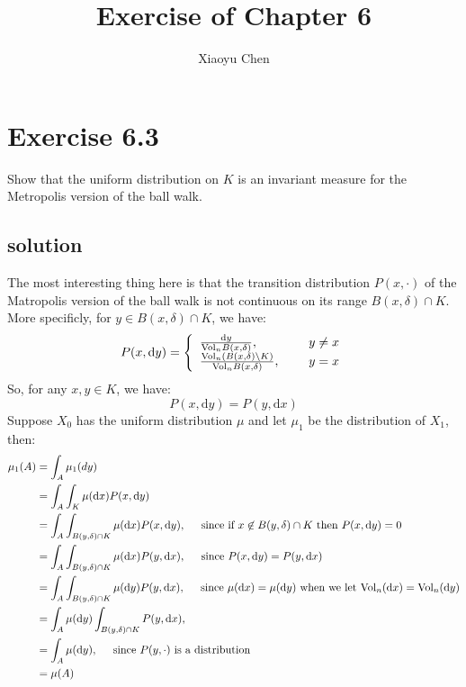 \documentclass{article}
\title{Exercise of Chapter 6}
\author{Xiaoyu Chen}
\date{}
\begin{document}
\maketitle
\section{Exercise 6.3}
Show that the uniform distribution on $K$ is an invariant measure for the Metropolis version of the ball walk.
\subsection{solution}
The most interesting thing here is that the transition distribution $P(x,\cdot)$ of the Matropolis version of the ball walk is not continuous on its range $B(x,\delta)\cap K$. More specificly, for $y\in B(x,\delta)\cap K$, we have:
\[
  P(x, \mathrm{d}y) = \left\{
    \begin{array}{lr}
      \frac{\mathrm{d}y}{\mathrm{Vol}_n B(x, \delta)}, \hspace{0.5cm} & y\not= x \\
      \frac{\mathrm{Vol}_n(B(x,\delta)\setminus K)}{\mathrm{Vol}_n B(x, \delta)}, \hspace{0.5cm} &y = x
    \end{array}
  \right.
\]
So, for any $x, y\in K$, we have:
\[
  P(x,\mathrm{d}y) = P(y, \mathrm{d}x)
\]
Suppose $X_0$ has the uniform distribution $\mu$ and let $\mu_1$ be the distribution of $X_1$, then:
\begin{align*}
  \mu_1(A) &= \int_A \mu_1(dy) \\
  &= \int_A\int_K \mu(\mathrm{d}x) P(x, \mathrm{d}y) \\
  &= \int_A\int_{B(y,\delta)\cap K} \mu(\mathrm{d}x) P(x, \mathrm{d}y), \hspace{0.5cm} \mbox{since if $x\not\in B(y,\delta)\cap K$ then $P(x,\mathrm{d}y) = 0$}\\
  &= \int_A\int_{B(y,\delta)\cap K} \mu(\mathrm{d}x) P(y, \mathrm{d}x), \hspace{0.5cm} \mbox{since $P(x,\mathrm{d}y) = P(y,\mathrm{d}x)$} \\
  &= \int_A\int_{B(y,\delta)\cap K} \mu(\mathrm{d}y) P(y, \mathrm{d}x), \hspace{0.5cm} \mbox{since $\mu(\mathrm{d}x) = \mu(\mathrm{d}y)$ when we let $\mathrm{Vol}_n(\mathrm{d}x) = \mathrm{Vol}_n(\mathrm{d}y)$} \\
  &= \int_A \mu(\mathrm{d}y)\int_{B(y,\delta)\cap K}  P(y, \mathrm{d}x), \hspace{0.5cm}\\
  &= \int_A \mu(\mathrm{d}y), \hspace{0.5cm} \mbox{since $P(y,\cdot)$ is a distribution} \\
  &= \mu(A)
\end{align*}
\end{document}
